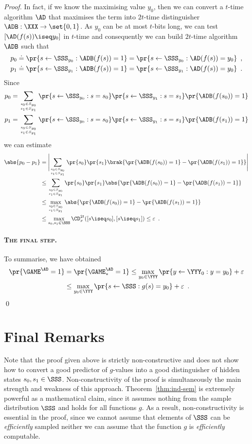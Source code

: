 \documentclass{llncs}
\begin{document}
\begin{proof}
In fact, if we know the maximising value $y_0$, then we can convert a
$t$-time algorithm $\AD$ that maximises the term into $2t$-time
distinguisher $\ADB:\XXX\to\set{0,1}$. As $y_0$ can be at most
$t$-bits long, we can test $[\AD(f(s))\iseq y_0]$ in $t$-time and
consequently we can build $2t$-time algorithm $\ADB$ such that
\begin{align*}
  &p_0\doteq \pr{s\gets\SSS_{y_0}:\ADB(f(s))=1}=\pr{s\gets\SSS_{y_0}:
    \AD(f(s))=y_0}\enspace,\\
  &p_1\doteq\pr{s\gets\SSS_{y_1}:\ADB(f(s))=1}=\pr{s\gets\SSS_{y_1}:
    \AD(f(s))=y_0}\enspace.
\end{align*}
Since
\begin{align*}
  p_0%
  &=\sum_{s_0\in S_{y_0}\atop s_1\in S_{y_1}}\pr{s\gets\SSS_{y_0}:s=s_0}\pr{s\gets\SSS_{y_1}:s=s_1}\pr{\ADB(f(s_0))=1}\\
  p_1 %
  &=\sum_{s_0\in S_{y_0}\atop s_1\in
    S_{y_1}}\pr{s\gets\SSS_{y_0}:s=s_0}\pr{s\gets\SSS_{y_1}:s=s_1}\pr{\ADB(f(s_1))=1}
\end{align*}
we can estimate
\begin{align*}
  \abs{p_0-p_1}
  &=\Biggl|\sum_{s_0\in S_{y_0}\atop s_1\in S_{y_1}}\pr{s_0}\pr{s_1}\brak{\pr{\ADB(f(s_0))=1}-\pr{\ADB(f(s_1))=1}}\Biggr|\\
  &\leq\sum_{s_0\in S_{y_0}\atop s_1\in S_{y_1}}\pr{s_0}\pr{s_1}\abs{\pr{\ADB(f(s_0))=1}-\pr{\ADB(f(s_1))=1}}\\
  &\leq\max_{s_0\in S_{y_0}\atop s_1\in S_{y_1}}\abs{\pr{\ADB(f(s_0))=1}-\pr{\ADB(f(s_1))=1}}\\
  &\leq\max_{s_0,s_1\in\SSS}\CD_x^{2t}([s\iseq s_0],[s\iseq s_1])\leq \varepsilon\enspace.
\end{align*}

\paragraph{\textsc{The final step}.}
To summarise, we have obtained
\begin{align*}
  \pr{\GAME^\AD=1}&=\pr{\GAME_*^\AD=1}\leq \max_{y_0\in\YYY}\pr{y\gets\YYY_0:y=y_0}+\varepsilon\\
  &\leq\max_{y_0\in\YYY}\pr{s\gets \SSS:g(s)=y_0}+\varepsilon\enspace. 
\end{align*}
\qed
\end{proof}

\section{Final Remarks}
Note that the proof given above is strictly non-constructive and does
not show how to convert a good predictor of $g$-values into a good
distinguisher of hidden states $s_0,s_1\in\SSS$. Non-constructivity
of the proof is simultaneously the main strength and weakness of this
approach. Theorem~\ref{thm:ind-sem} is extremely powerful as a
mathematical claim, since it assumes nothing from the sample
distribution $\SSS$ and holds for all functions $g$. As a result,
non-constructivity is essential in the proof, since we cannot assume
that elements of $\SSS$ can be \emph{efficiently} sampled neither we
can assume that the function $g$ is \emph{efficiently} computable.
\end{document}
